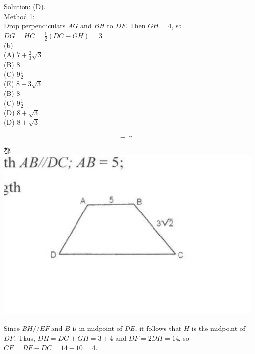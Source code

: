 \documentclass[10pt]{article}
\begin{document}
Solution: (D).\\
Method 1:\\
Drop perpendiculars \(\overline{A G}\) and \(\overline{B H}\) to \(\overline{D F}\). Then \(G H=4\), so \(D G=H C=\frac{1}{2}(D C-G H)=3\)\\
(b)\\
(A) \(7+\frac{2}{3} \sqrt{3}\)\\
(B) 8\\
(C) \(9 \frac{1}{2}\)\\
(E) \(8+3 \sqrt{3}\)\\
(B) 8\\
(C) \(9 \frac{1}{2}\)\\
(D) \(8+\sqrt{3}\)\\
(D) \(8+\sqrt{3}\)

\[
-\ln
\]

都\\
\includegraphics[max width=\textwidth, center]{2025_04_17_97bc1f7e44d93c271a88g-076}


Since \(\overline{B H} / / \overline{E F}\) and \(B\) is in midpoint of \(D E\), it follows that \(H\) is the midpoint of \(D F\). Thus, \(D H=D G+G H=3+4\) and \(D F=2 D H=14\), so \(C F=D F-D C=14-10=4\).
\end{document}
